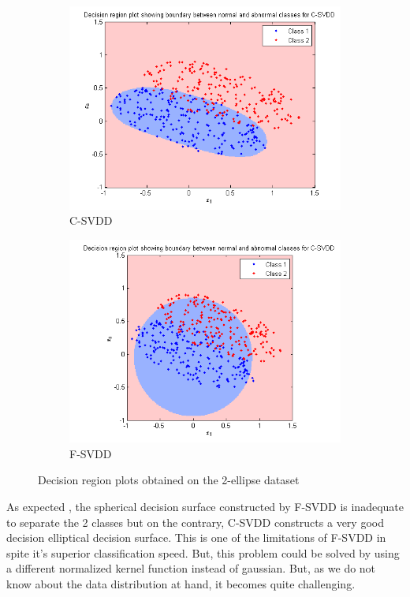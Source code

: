 \documentclass{article} %
\begin{document}
\begin{figure}
\begin{subfigure}{.5\textwidth}
  \centering
  \includegraphics[width=\linewidth]{../Code/Ellipse/svdd/decn}
\caption{C-SVDD} 
\end{subfigure}%
\begin{subfigure}{.5\textwidth}
  \centering
  \includegraphics[width=\linewidth]{../Code/Ellipse/fsvdd/decn}
\caption{F-SVDD}  
\end{subfigure}
\caption{Decision region plots obtained on the 2-ellipse dataset}
\end{figure}


As expected , the spherical decision surface constructed by F-SVDD is inadequate to separate the 2 classes but on the contrary, C-SVDD constructs a very good decision elliptical decision surface. This is one of the limitations of F-SVDD in spite it's superior classification speed. But, this problem could be solved by using a different normalized kernel function instead of gaussian. But, as we do not know about the data distribution at hand, it becomes quite challenging.
\end{document}
